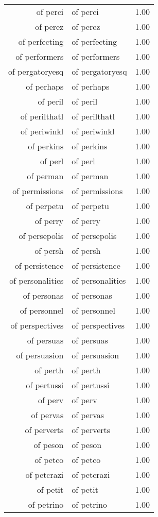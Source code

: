 \begin{table}[ht]
\begin{tabular}{rlr}
  of perci & of perci & 1.00 \\ 
  of perez & of perez & 1.00 \\ 
  of perfecting & of perfecting & 1.00 \\ 
  of performers & of performers & 1.00 \\ 
  of pergatoryesq & of pergatoryesq & 1.00 \\ 
  of perhaps & of perhaps & 1.00 \\ 
  of peril & of peril & 1.00 \\ 
  of perilthatl & of perilthatl & 1.00 \\ 
  of periwinkl & of periwinkl & 1.00 \\ 
  of perkins & of perkins & 1.00 \\ 
  of perl & of perl & 1.00 \\ 
  of perman & of perman & 1.00 \\ 
  of permissions & of permissions & 1.00 \\ 
  of perpetu & of perpetu & 1.00 \\ 
  of perry & of perry & 1.00 \\ 
  of persepolis & of persepolis & 1.00 \\ 
  of persh & of persh & 1.00 \\ 
  of persistence & of persistence & 1.00 \\ 
  of personalities & of personalities & 1.00 \\ 
  of personas & of personas & 1.00 \\ 
  of personnel & of personnel & 1.00 \\ 
  of perspectives & of perspectives & 1.00 \\ 
  of persuas & of persuas & 1.00 \\ 
  of persuasion & of persuasion & 1.00 \\ 
  of perth & of perth & 1.00 \\ 
  of pertussi & of pertussi & 1.00 \\ 
  of perv & of perv & 1.00 \\ 
  of pervas & of pervas & 1.00 \\ 
  of perverts & of perverts & 1.00 \\ 
  of peson & of peson & 1.00 \\ 
  of petco & of petco & 1.00 \\ 
  of petcrazi & of petcrazi & 1.00 \\ 
  of petit & of petit & 1.00 \\ 
  of petrino & of petrino & 1.00 \\ 

\end{tabular}
\end{table}
